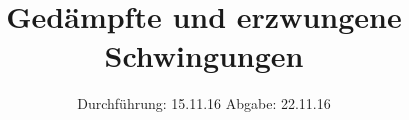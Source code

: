 

\subject{V354}
\title{Gedämpfte und erzwungene Schwingungen}
\date{
  Durchführung: 15.11.16
  \hspace{3em}
  Abgabe: 22.11.16
}



\maketitle
\thispagestyle{empty}
\tableofcontents
\newpage








\printbibliography



